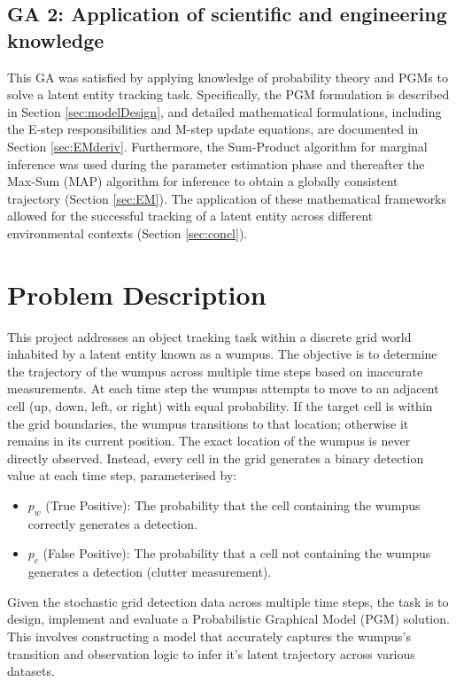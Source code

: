 \documentclass[10pt]{article}
\begin{document}
\subsection*{GA 2: Application of scientific and engineering knowledge}
This GA was satisfied by applying knowledge of probability theory and 
PGMs to solve a latent entity tracking task. Specifically, the PGM formulation is described in Section \ref{sec:modelDesign}, and detailed mathematical formulations, including the E-step responsibilities and 
M-step update equations, are documented in Section \ref{sec:EMderiv}. Furthermore, the Sum-Product algorithm for marginal inference 
was used during the parameter estimation phase and thereafter the Max-Sum (MAP) algorithm for inference to 
obtain a globally consistent trajectory (Section \ref{sec:EM}). The application of these mathematical frameworks 
allowed for the successful tracking of a latent entity across different environmental 
contexts (Section \ref{sec:concl}).

\section{Problem Description}
\label{sec:prob}
This project addresses an object tracking task within a discrete grid world inhabited by a latent entity known as a wumpus. The objective is to determine the trajectory 
of the wumpus across multiple time steps based on inaccurate measurements. At each time step the wumpus attempts to move to an adjacent cell (up, down, left, or right) 
with equal probability. If the target cell is within the grid boundaries, the wumpus transitions to that location; otherwise it remains in its current position. The 
exact location of the wumpus is never directly observed. Instead, every cell in the grid generates a binary detection value at each time step, parameterised by:
\begin{itemize}
    \item $p_w$ (True Positive): The probability that the cell containing the wumpus correctly generates a detection.
    \item $p_c$ (False Positive): The probability that a cell not containing the wumpus generates a detection (clutter measurement).
\end{itemize}

Given the stochastic grid detection data across multiple time steps, the task is to design, implement and evaluate a Probabilistic Graphical Model (PGM) solution. 
This involves constructing a model that accurately captures the wumpus's transition and observation logic to infer it's latent trajectory across various datasets. 
\end{document}
